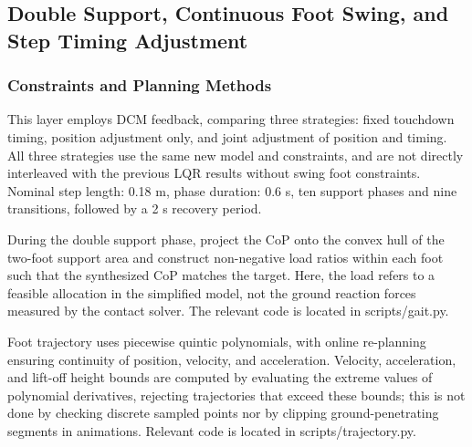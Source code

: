 \subsection{Double Support, Continuous Foot Swing, and Step Timing Adjustment}\label{s20-detail-4}

\subsubsection{Constraints and Planning Methods}\label{s20-detail-5}

This layer employs DCM feedback, comparing three strategies: fixed touchdown timing, position adjustment only, and joint adjustment of position and timing. All three strategies use the same new model and constraints, and are not directly interleaved with the previous LQR results without swing foot constraints. Nominal step length: 0.18 m, phase duration: 0.6 s, ten support phases and nine transitions, followed by a 2 s recovery period.

During the double support phase, project the CoP onto the convex hull of the two-foot support area and construct non-negative load ratios within each foot such that the synthesized CoP matches the target. Here, the load refers to a feasible allocation in the simplified model, not the ground reaction forces measured by the contact solver. The relevant code is located in scripts/gait.py.

Foot trajectory uses piecewise quintic polynomials, with online re-planning ensuring continuity of position, velocity, and acceleration. Velocity, acceleration, and lift-off height bounds are computed by evaluating the extreme values of polynomial derivatives, rejecting trajectories that exceed these bounds; this is not done by checking discrete sampled points nor by clipping ground-penetrating segments in animations. Relevant code is located in scripts/trajectory.py.

